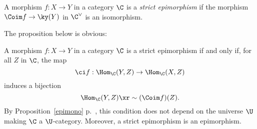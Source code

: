 \documentclass[12pt]{article}
\theoremstyle{remark}
\theoremstyle{definition}
\begin{document}
\begin{df} 
A morphism $f:X\to Y$ in a category $\C$ is a {\em strict epimorphism} if the morphism $\Coim f\to\ky(Y)$ in $\C^\vee$ is an isomorphism.
\end{df} 

The proposition below is obvious:

\begin{prop}
A morphism $f:X\to Y$ in a category $\C$ is a strict epimorphism if and only if, for all $Z$ in $\C$, the map 
$$
\ci f:\Hom_\C(Y,Z)\to\Hom_\C(X,Z)
$$ 
induces a bijection 
$$
\Hom_\C(Y,Z)\xr\sim(\Coim f)(Z).
$$ 
By Proposition~\ref{epimono} p.~, this condition does not depend on the universe $\U$ making $\C$ a $\U$-category. Moreover, a strict epimorphism is an epimorphism. 
\end{prop}


\end{document}
